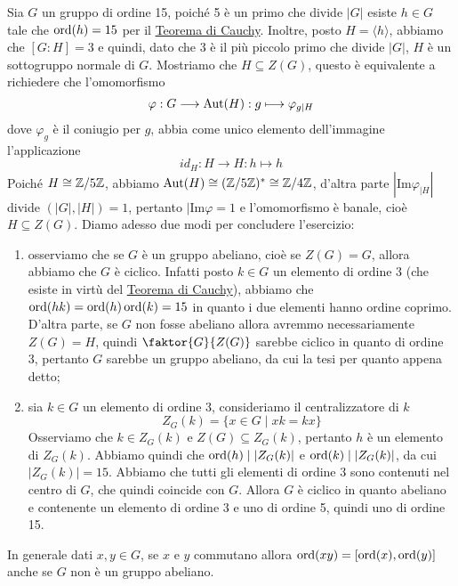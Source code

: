 \documentclass[11pt]{scrartcl}
\begin{document}
\begin{soln}
    Sia $G$ un gruppo di ordine 15, poiché 5 è un primo che divide $|G|$
    esiste $h \in G$ tale che $\operatorname{ord}(h) = 15$ per il \hyperref[teorema1.0]{Teorema di Cauchy}.
    Inoltre, posto $H = \langle h\rangle$, abbiamo che $[G:H] = 3$ e quindi,
    dato che 3 è il più piccolo primo che divide $|G|$, $H$ è un sottogruppo 
    normale di $G$. Mostriamo che $H \subseteq Z(G)$, questo è equivalente a 
    richiedere che l'omomorfismo \[
        \varphi: G\longrightarrow \operatorname{Aut}(H) :g\longmapsto \varphi_{g\mid H}
    \]
    dove $\varphi_g$ è il coniugio per $g$, abbia come unico elemento dell'immagine
    l'applicazione
    \[
        id_H:H\longrightarrow H: h \longmapsto h
    \]
    Poiché $H \cong \mathbb{Z}/{5}\mathbb{Z}$, abbiamo $\operatorname{Aut}(H)\cong (\mathbb{Z}/{5}\mathbb{Z})^* \cong \mathbb{Z}/{4}\mathbb{Z}$, d'altra 
    parte $|\mathrm{Im}\varphi_{\mid H}|$ divide $(|G|, |H|) = 1$, pertanto
    $|\mathrm{Im}\varphi = 1$ e l'omomorfismo è banale, cioè $H \subseteq Z(G)$.
    Diamo adesso due modi per concludere l'esercizio:
    \begin{enumerate}[(1)]
        \item osserviamo che se $G$ è un gruppo abeliano, cioè se $Z(G) = G$,
        allora abbiamo che $G$ è ciclico. Infatti posto $k \in G$ un elemento di 
        ordine 3 (che esiste in virtù del \hyperref[teorema1.0]{Teorema di Cauchy}),
        abbiamo che $\operatorname{ord}(hk) = \operatorname{ord}(h)\operatorname{ord}(k) = 15$ in quanto i due elementi hanno
        ordine coprimo. D'altra parte, se $G$ non fosse abeliano allora avremmo 
        necessariamente $Z(G) = H$, quindi $\faktor{G}{Z(G)}$ sarebbe ciclico 
        in quanto di ordine 3, pertanto $G$ sarebbe un gruppo abeliano, da cui 
        la tesi per quanto appena detto;
        \item sia $k \in G$ un elemento di ordine 3, consideriamo il centralizzatore
        di $k$
        \[
            Z_G(k) = \{x \in G\mid xk = kx\}
        \]Osserviamo che $k \in Z_G(k)$ e $Z(G) \subseteq Z_G(k)$, pertanto $h$ è un elemento 
        di $Z_G(k)$. Abbiamo quindi che $\operatorname{ord}(h)\mid |Z_G(k)|$ e $\operatorname{ord}(k)\mid |Z_G(k)|$, 
        da cui $|Z_G(k)| = 15$. Abbiamo che tutti gli elementi di ordine 3
        sono contenuti nel centro di $G$, che quindi coincide con $G$. Allora $G$
        è ciclico in quanto abeliano e contenente un elemento di ordine 3 e uno
        di ordine 5, quindi uno di ordine 15.
    \end{enumerate}
\end{soln}

\begin{remark}
    In generale dati $x, y\in G$, se $x$ e $y$ commutano allora 
    $\operatorname{ord}(xy) = [\operatorname{ord}(x), \operatorname{ord}(y)]$ anche se $G$ non è un gruppo abeliano.
\end{remark}
\end{document}
